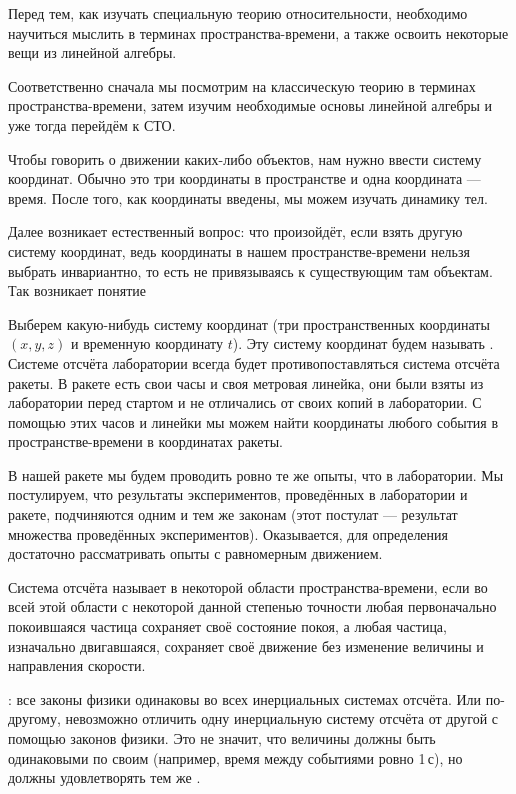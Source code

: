 \documentclass[a4paper,12pt]{article}
\begin{document}

{\footnotesize
Перед тем, как изучать специальную теорию относительности,
необходимо научиться мыслить в терминах пространства-времени,
а также освоить некоторые вещи из линейной алгебры.

Соответственно сначала мы посмотрим на классическую теорию в терминах пространства-времени,
затем изучим необходимые основы линейной алгебры и уже тогда перейдём к СТО.

Чтобы говорить о движении каких-либо объектов, нам нужно ввести систему координат.
Обычно это три координаты в пространстве и одна координата --- время. После того, как координаты введены, мы можем изучать динамику тел.

Далее возникает естественный вопрос: что произойдёт, если взять другую систему координат,
ведь координаты в нашем пространстве-времени нельзя выбрать инвариантно, то есть не привязываясь к существующим там объектам.
Так возникает понятие 

Выберем какую-нибудь систему координат (три пространственных координаты $(x,y,z)$ и временную координату $t$).
Эту систему координат будем называть .
Системе отсчёта лаборатории всегда будет противопоставляться система отсчёта  ракеты.
В ракете есть свои часы и своя метровая линейка,
они были взяты из лаборатории перед стартом и не отличались от своих копий в лаборатории.
С помощью этих часов и линейки мы можем найти координаты любого события в пространстве-времени в координатах ракеты.

В нашей ракете мы будем проводить ровно те же опыты, что в лаборатории.
Мы постулируем, что результаты экспериментов, проведённых в лаборатории и ракете, подчиняются одним и тем же законам
(этот постулат --- результат множества проведённых экспериментов).
Оказывается, для определения достаточно рассматривать опыты с равномерным движением.
\spacer

}

Система отсчёта называет  в некоторой области пространства-времени, если во всей этой области с некоторой данной степенью точности любая первоначально покоившаяся частица сохраняет своё состояние покоя, а любая частица, изначально двигавшаяся, сохраняет своё движение без изменение величины и направления скорости.

: все законы физики одинаковы во всех инерциальных системах отсчёта.
Или по-другому, невозможно отличить одну инерциальную систему отсчёта от другой с помощью законов физики.
Это не значит, что величины должны быть одинаковыми по своим  (например, время между событиями ровно 1\,с), но должны удовлетворять тем же .
\end{document}
